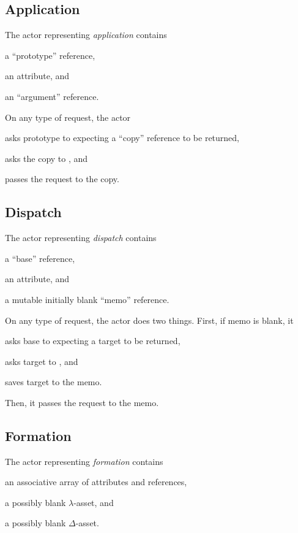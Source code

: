 \subsection{Application}

The actor representing \emph{application} contains
\begin{inparaenum}[1)]
\item a ``prototype'' reference,
\item an attribute,
and
\item an ``argument'' reference.
\end{inparaenum}

On any type of request, the actor
\begin{inparaenum}[1)]
\item asks prototype to  expecting a ``copy'' reference to be returned,
\item asks the copy to ,
and
\item passes the request to the copy.
\end{inparaenum}

\subsection{Dispatch}

The actor representing \emph{dispatch} contains
\begin{inparaenum}[1)]
\item a ``base'' reference,
\item an attribute,
and
\item a mutable initially blank ``memo'' reference.
\end{inparaenum}

On any type of request, the actor does two things.
First, if memo is blank, it
\begin{inparaenum}[1)]
\item asks base to  expecting a target to be returned,
\item asks target to ,
and
\item saves target to the memo.
\end{inparaenum}
Then, it passes the request to the memo.

\subsection{Formation}

The actor representing \emph{formation} contains
\begin{inparaenum}[1)]
\item an associative array of attributes and references,
\item a possibly blank \(\lambda\)-asset,
and
\item a possibly blank \(\Delta\)-asset.
\end{inparaenum}

